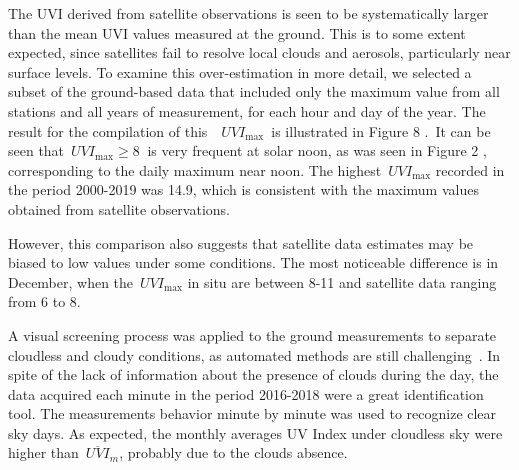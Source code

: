 \documentclass{article}
\begin{document}
{The UVI derived from satellite observations is seen to be systematically
larger than the mean UVI values measured at the ground. This is to some
extent expected, since satellites fail to resolve local clouds and
aerosols, particularly near surface levels. To examine this
over-estimation in more detail, we selected a subset of the ground-based
data that included only the maximum value from all stations and all
years of measurement, for each hour and day of the year. The result for
the compilation of this~~\(UVI_{\max}\)~is illustrated in
Figure 8 %
.~It can be seen
that~\(UVI_{\max}\ge8\ \) is very frequent at solar noon, as was seen in
Figure 2%
, corresponding to the daily
maximum near noon. The highest~\(UVI_{\max}\) recorded in the period
2000-2019 was 14.9, which is consistent with the maximum values obtained
from satellite observations.

However, this comparison also suggests that satellite data estimates may
be biased to low values under some conditions. The most noticeable
difference is in December, when the~\(UVI_{\max}\) in situ are
between 8-11 and satellite data ranging from 6 to 8.~

A visual screening process was applied to the ground measurements to
separate cloudless and cloudy conditions, as automated methods are still
challenging~\cite{Badosa2014,Wild2019}. In spite of the lack of information
about the presence of clouds during the day, the data acquired each
minute in the period 2016-2018 were a great identification tool. The
measurements behavior minute by minute was used to recognize clear sky
days. As expected, the monthly averages UV Index under cloudless sky
were higher than~\(\overline{UVI}_m\), probably due to the clouds absence.

}
\end{document}
